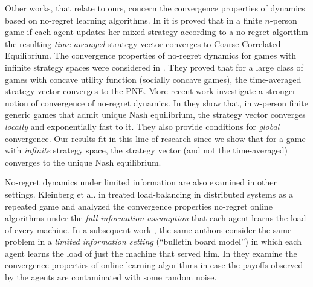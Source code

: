 Other works, that relate to ours, concern the convergence
properties of dynamics based on no-regret learning algorithms.
In \cite{FV97,FS99,SA00,SALS15} it is proved that in a finite $n$-person
game if each agent updates her mixed strategy according to a no-regret
algorithm the resulting \emph{time-averaged} strategy vector converges to
Coarse Correlated Equilibrium. The convergence properties of no-regret dynamics
for games with infinite strategy spaces were considered in \cite{EMN09}.
They proved that for a large class of games with concave utility function
(socially concave games), the time-averaged strategy vector converges to
the PNE. More recent work investigate a stronger notion of convergence of
no-regret dynamics. In \cite{CHM17} they show that,
in $n$-person finite generic games that admit unique Nash equilibrium,
the strategy vector converges \emph{locally} and exponentially fast
to it. They also provide conditions for \emph{global} convergence.
Our results fit in this line of research since we show that
for a game with \emph{infinite} strategy space, the strategy vector
(and not the time-averaged) converges to the unique Nash equilibrium.

No-regret dynamics under limited information are also examined
in other settings. Kleinberg et al. in \cite{KPT09} treated
load-balancing in distributed systems as
a repeated game and analyzed the convergence properties
no-regret online algorithms under the \emph{full information assumption}
that each agent learns the load of every machine.
In a subsequent work \cite{KPT11}, the same authors consider the
same problem in a \emph{limited information setting} (\enquote{bulletin board model})
in which each agent learns the load of just the machine
that served him. In \cite{HCM17,MS17} they examine the convergence
properties of online learning algorithms in case the payoffs observed
by the agents are contaminated with some random noise.
